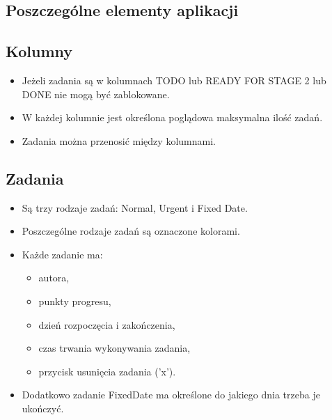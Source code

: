 \documentclass{article}
\begin{document}
\subsection{Poszczególne elementy aplikacji}

\subsection{Kolumny}
\begin{itemize}
    \item Jeżeli zadania są w kolumnach TODO lub READY FOR STAGE 2 lub DONE nie mogą być zablokowane.
    \item W każdej kolumnie jest określona poglądowa maksymalna ilość zadań.
    \item Zadania można przenosić między kolumnami.
\end{itemize}

\subsection{Zadania}
\begin{itemize}
    \item Są trzy rodzaje zadań: Normal, Urgent i Fixed Date.
    \item Poszczególne rodzaje zadań są oznaczone kolorami.
    \item Każde zadanie ma:
    \begin{itemize}
        \item autora,
        \item punkty progresu,
        \item dzień rozpoczęcia i zakończenia,
        \item czas trwania wykonywania zadania,
        \item przycisk usunięcia zadania ('x').
    \end{itemize}
    \item Dodatkowo zadanie FixedDate ma określone do jakiego dnia trzeba je ukończyć.
\end{itemize}
\end{document}

